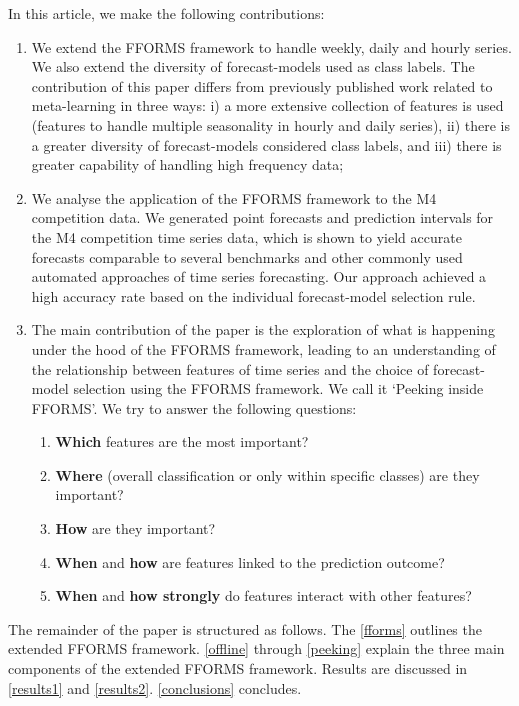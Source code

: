 \documentclass[11pt,a4paper,]{article}
\providecommand{\tightlist}{%
  \setlength{\itemsep}{0pt}\setlength{\parskip}{0pt}}
\begin{document}
In this article, we make the following contributions:

\begin{enumerate}
\def\labelenumi{\arabic{enumi}.}
\tightlist
\item
  We extend the FFORMS framework to handle weekly, daily and hourly series. We also extend the diversity of forecast-models used as class labels. The contribution of this paper differs from previously published work related to meta-learning \autocites{prudencio2004meta}{lemke2010meta}{kuck2016meta} in three ways: i) a more extensive collection of features is used (features to handle multiple seasonality in hourly and daily series), ii) there is a greater diversity of forecast-models considered class labels, and iii) there is greater capability of handling high frequency data;
\item
  We analyse the application of the FFORMS framework to the M4 competition data. We generated point forecasts and prediction intervals for the M4 competition time series data, which is shown to yield accurate forecasts comparable to several benchmarks and other commonly used automated approaches of time series forecasting. Our approach achieved a high accuracy rate based on the individual forecast-model selection rule.
\item
  The main contribution of the paper is the exploration of what is happening under the hood of the FFORMS framework, leading to an understanding of the relationship between features of time series and the choice of forecast-model selection using the FFORMS framework. We call it `Peeking inside FFORMS'. We try to answer the following questions:

  \begin{enumerate}
  \def\labelenumii{\roman{enumii})}
  \tightlist
  \item
    \textbf{Which} features are the most important?
  \item
    \textbf{Where} (overall classification or only within specific classes) are they important?
  \item
    \textbf{How} are they important?
  \item
    \textbf{When} and \textbf{how} are features linked to the prediction outcome?
  \item
    \textbf{When} and \textbf{how strongly} do features interact with other features?
  \end{enumerate}
\end{enumerate}

The remainder of the paper is structured as follows. The \autoref{fforms} outlines the extended FFORMS framework. \autoref{offline} through \autoref{peeking} explain the three main components of the extended FFORMS framework. Results are discussed in \autoref{results1} and \autoref{results2}. \autoref{conclusions} concludes.
\end{document}
